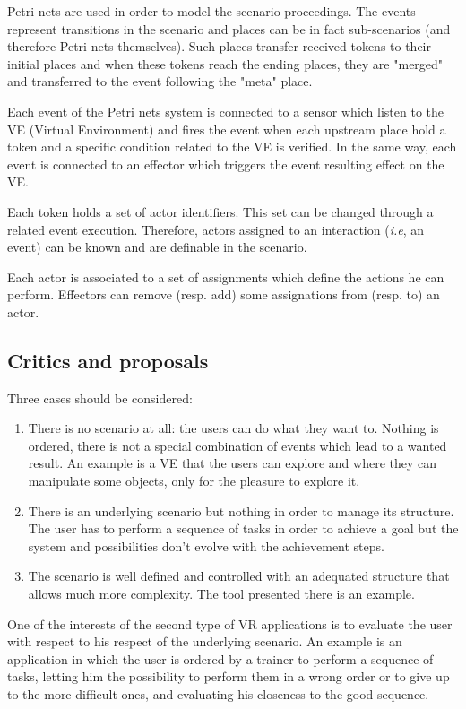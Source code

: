 \documentclass[a4paper]{article}
\begin{document}
Petri nets are used in order to model the scenario proceedings. The events represent transitions in the scenario and places can be in fact sub-scenarios (and therefore Petri nets themselves). Such places transfer received tokens to their initial places and when these tokens reach the ending places, they are "merged" and transferred to the event following the "meta" place.

Each event of the Petri nets system  is connected to a sensor which listen to the VE (Virtual Environment) and fires the event when each upstream place hold a token and a specific condition related to the VE is verified. In the same way, each event is connected to an effector which triggers the event resulting effect on the VE.

Each token holds a set of actor identifiers. This set can be changed through a related event execution. Therefore, actors assigned to an interaction (\textit{i.e}, an event) can be known and are definable in the scenario.

Each actor is associated to a set of assignments which define the actions he can perform. Effectors can remove (resp. add) some assignations from (resp. to) an actor.

\subsection{Critics and proposals}
Three cases should be considered:
\begin{enumerate}
	\item There is no scenario at all: the users can do what they want to. Nothing is ordered, there is not a special combination of events which lead to a wanted result. An example is a VE that the users can explore and where they can manipulate some objects, only for the pleasure to explore it.
	\item There is an underlying scenario but nothing in order to manage its structure. The user has to perform a sequence of tasks in order to achieve a goal but the system and possibilities don't evolve with the achievement steps.
	\item The scenario is well defined and controlled with an adequated structure that allows much more complexity. The tool presented there is an example.
\end{enumerate}

One of the interests of the second type of VR applications is to evaluate the user with respect to his respect of the underlying scenario. An example is an application in which the user is ordered by a trainer to perform a sequence of tasks, letting him the possibility to perform them in a wrong order or to give up to the more difficult ones, and evaluating his closeness to the good sequence.
\end{document}
